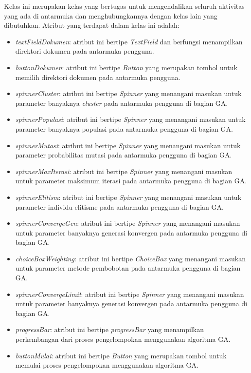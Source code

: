 Kelas ini merupakan kelas yang bertugas untuk mengendalikan seluruh aktivitas yang ada di antarmuka dan menghubungkannya dengan kelas lain yang dibutuhkan. Atribut yang terdapat dalam kelas ini adalah:

\begin{itemize}
	\item \textit{textFieldDokumen}: atribut ini bertipe \textit{TextField} dan berfungsi menampilkan direktori dokumen pada antarmuka pengguna.
	\item \textit{buttonDokumen}: atribut ini bertipe \textit{Button} yang merupakan tombol untuk memilih direktori dokumen pada antarmuka pengguna.
	\item \textit{spinnerCluster}: atribut ini bertipe \textit{Spinner} yang menangani masukan untuk parameter banyaknya \textit{cluster} pada antarmuka pengguna di bagian GA.
	\item \textit{spinnerPopulasi}: atribut ini bertipe \textit{Spinner} yang menangani masukan untuk parameter banyaknya populasi pada antarmuka pengguna di bagian GA.
	\item \textit{spinnerMutasi}: atribut ini bertipe \textit{Spinner} yang menangani masukan untuk parameter probabilitas mutasi pada antarmuka pengguna di bagian GA.
	\item \textit{spinnerMaxIterasi}: atribut ini bertipe \textit{Spinner} yang menangani masukan untuk parameter maksimum iterasi pada antarmuka pengguna di bagian GA.
	\item \textit{spinnerElitism}: atribut ini bertipe \textit{Spinner} yang menangani masukan untuk parameter individu elitisme pada antarmuka pengguna di bagian GA.
	\item \textit{spinnerConvergeGen}: atribut ini bertipe \textit{Spinner} yang menangani masukan untuk parameter banyaknya generasi konvergen pada antarmuka pengguna di bagian GA.
	\item \textit{choiceBoxWeighting}: atribut ini bertipe \textit{ChoiceBox} yang menangani masukan untuk parameter metode pembobotan pada antarmuka pengguna di bagian GA.
	\item \textit{spinnerConvergeLimit}: atribut ini bertipe \textit{Spinner} yang menangani masukan untuk parameter banyaknya generasi konvergen pada antarmuka pengguna di bagian GA.
	\item \textit{progressBar}: atribut ini bertipe \textit{progressBar} yang menampilkan perkembangan dari proses pengelompokan menggunakan algoritma GA.
	\item \textit{buttonMulai}: atribut ini bertipe \textit{Button} yang merupakan tombol untuk memulai proses pengelompokan menggunakan algoritma GA.

\end{itemize}
